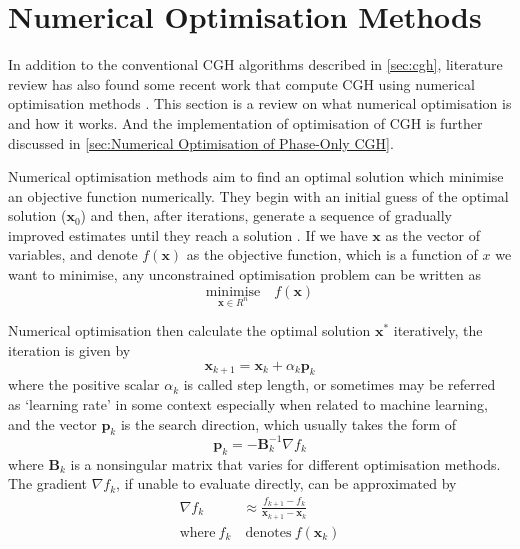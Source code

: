 \newpage
\section{Numerical Optimisation Methods} \label{sec:Numerical Optimisation Methods}
In addition to the conventional CGH algorithms described in \cref{sec:cgh}, literature review has also found some recent work that compute CGH using numerical optimisation methods \cite{Zhang2017, Liu2020, Choi2021, Chen2021, Kadis2022}. This section is a review on what numerical optimisation is and how it works. And the implementation of optimisation of CGH is further discussed in \cref{sec:Numerical Optimisation of Phase-Only CGH}.

Numerical optimisation methods aim to find an optimal solution which minimise an objective function numerically. They begin with an initial guess of the optimal solution ($\textbf{x}_{0}$) and then, after iterations, generate a sequence of gradually improved estimates until they reach a solution \cite{Nocedal2006}. If we have $\textbf{x}$ as the vector of variables, and denote $f(\textbf{x})$ as the objective function, which is a function of $x$ we want to minimise, any unconstrained optimisation problem can be written as
\begin{equation}
  \underset{\textbf{x}\in R^n}{\text{minimise}}\quad f(\textbf{x})
  \label{eq:minimise_F}
\end{equation}

Numerical optimisation then calculate the optimal solution $\textbf{x}^*$ iteratively, the iteration is given by
\begin{equation}
  \textbf{x}_{k+1} = \textbf{x}_k+\alpha_k \textbf{p}_k
  \label{eq:optimisation_iteration}
\end{equation}
where the positive scalar $\alpha_k$ is called step length, or sometimes may be referred as `learning rate' in some context especially when related to machine learning, and the vector $\textbf{p}_k$ is the search direction, which usually takes the form of
\begin{equation}
  \textbf{p}_k = -\textbf{B}_k^{-1} \nabla f_{k} \label{eq:general-descent-direction}
\end{equation}
where $\textbf{B}_k$ is a nonsingular matrix that varies for different optimisation methods. The gradient $\nabla f_k$, if unable to evaluate directly, can be approximated by
\begin{align}
  \nabla f_k         & \approx \frac{f_{k+1}-f_{k}}{\textbf{x}_{k+1}-\textbf{x}_{k}} \nonumber \\
  \text{where}\  f_k & \ \text{denotes}\  f(\textbf{x}_k)
\end{align}

